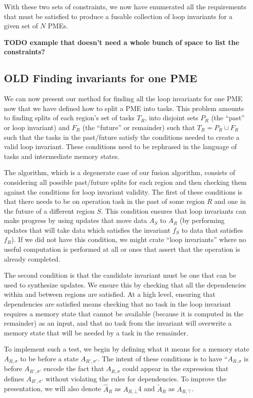 \documentclass[12pt,letterpaper]{article}
\newcommand*{\opf}{f}
\begin{document}
With these two sets of constraints, we now have enumerated all the requirements that must be satisfied to produce a fusable collection of loop invariants for a given set of $N$ PMEs.

\textbf{TODO example that doesn't need a whole bunch of space to list the constraints?}
\subsection{OLD Finding invariants for one PME}
We can now present our method for finding all the loop invariants for one PME now that we have defined how to split a PME into tasks.
This problem amounts to finding splits of each region's set of tasks $T_R$, into disjoint sets $P_R$ (the ``past'' or loop invariant) and $F_R$ (the ``future'' or remainder) such that $T_R = P_R \cup F_R$ such that the tasks in the past/future satisfy the conditions needed to create a valid loop invariant.
These conditions need to be rephrased in the language of tasks and intermediate memory states.

The algorithm, which is a degenerate case of our fusion algorithm, consists of considering all possible past/future splits for each region and then checking them against the conditions for loop invariant validity.
The first of these conditions is that there needs to be on operation task in the past of some region $R$ and one in the future of a different region $S$.
This condition ensures that loop invariants can make progress by using updates that move data $A_S$ to $A_R$ (by performing updates that will take data which satisfies the invariant $\opf_S$ to data that satisfies $\opf_R$).
If we did not have this condition, we might crate ``loop invariants'' where no useful computation is performed at all or ones that assert that the operation is already completed.

The second condition is that the candidate invariant must be one that can be used to synthesize updates.
We ensure this by checking that all the dependencies within and between regions are satisfied.
At a high level, ensuring that dependencies are satisfied means checking that no task in the loop invariant requires a memory state that cannot be available (because it is computed in the remainder) as an input, and that no task from the invariant will overwrite a memory state that will be needed by a task in the remainder.

To implement such a test, we begin by defining what it means for a memory state $A_{R, \sigma}$ to be before a state $A_{R', \sigma'}$.
The intent of these conditions is to have ``$A_{R, \sigma}$ is before $A_{R', \sigma'}$ encode the fact that $A_{R, \sigma}$ could appear in the expression that defines $A_{R', \sigma'}$ without violating the rules for dependencies.
To improve the presentation, we will also denote $\hat{A}_R$ as $A_{R, \bot}$4 and $\widetilde{A}_R$ as $A_{R, \top}$.
\end{document}

